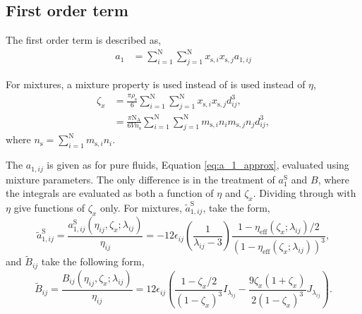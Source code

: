 \documentclass[english]{../thermomemo/thermomemo}
\newcommand*{\lb}{\left(}
\newcommand*{\rb}{\right)}
\newcommand{\seg}{\ensuremath{\text{s}}\xspace}
\newcommand{\aS}{\ensuremath{a_{1}^{\text{S}}}\xspace}
\newcommand{\Bt}{\ensuremath{\tilde{B}}\xspace}
\newcommand{\aSij}{\ensuremath{a_{1,ij}^{\text{S}}}\xspace}
\newcommand{\aStij}{\ensuremath{\tilde{a}_{1,ij}^{\text{S}}}\xspace}
\newcommand{\eff}{\ensuremath{\text{eff}}\xspace}
\newcommand{\z}{\zeta}
\newcommand{\nc}{\ensuremath{\text{N}}\xspace}
\newcommand{\NA}{\ensuremath{\text{N}_{\text{A}}}\xspace}
\begin{document}
\subsection{First order term}
The first order term is described as,
\begin{align}
  \label{eq:a_1_mix}
  a_1 &=  \sum_{i=1}^\nc\sum_{j=1}^\nc x_{\seg,i}x_{\seg,j} a_{1,ij}
\end{align}

For mixtures, a mixture property is used instead of is used instead of $\eta$,
\begin{align}
  \label{eq:z_x}
  \z_{x} &= \frac{\pi \rho_\seg}{6} \sum_{i=1}^\nc\sum_{j=1}^\nc x_{\seg,i}x_{\seg,j} d_{ij}^3,\\
         &= \frac{\pi \NA}{6 V n_{\seg}} \sum_{i=1}^\nc\sum_{j=1}^\nc m_{\seg,i} n_im_{\seg,j}n_j d_{ij}^3,
\end{align}
where $n_\seg = \sum_{i=1}^\nc m_{\seg,i} n_i$.

The $a_{1,ij}$ is given as for pure fluids, Equation
\ref{eq:a_1_approx}, evaluated using mixture parameters. The only
difference is in the treatment of $\aS$ and $B$, where the integrals
are evaluated as both a function of $\eta$ and $\z_x$. Dividing
through with $\eta$ give functions of $\z_x$ only. For mixtures,
$\aStij$, take the form,
\begin{equation}
  \label{eq:a_1_S_mix}
  \aStij = \frac{\aSij\lb \eta_{ij}, \z_x; \lambda_{ij} \rb}{\eta_{ij}} = -12 \epsilon_{ij} \lb \frac{1}{\lambda_{ij} - 3} \rb \frac{1 - \eta_\eff\lb \z_x; \lambda_{ij} \rb / 2}{\lb 1 - \eta_\eff\lb \z_x; \lambda_{ij} \rb \rb^3},
\end{equation}
and $\Bt_{ij}$ take the following form,
\begin{equation}
  \label{eq:c_B_mix}
  \Bt_{ij} =  \frac{B_{ij} \lb \eta_{ij}, \z_{x}; {\lambda_{ij}}\rb}{\eta_{ij}}  = 12  \epsilon_{ij} \lb \frac{1 - \z_x/2}{\lb 1 - \z_x\rb^3} I_{\lambda_{ij}}  - \frac{9\z_x\lb 1+ \z_x\rb}{2 \lb 1- \z_x\rb^3} J_{\lambda_{ij}} \rb.
\end{equation}
\end{document}
